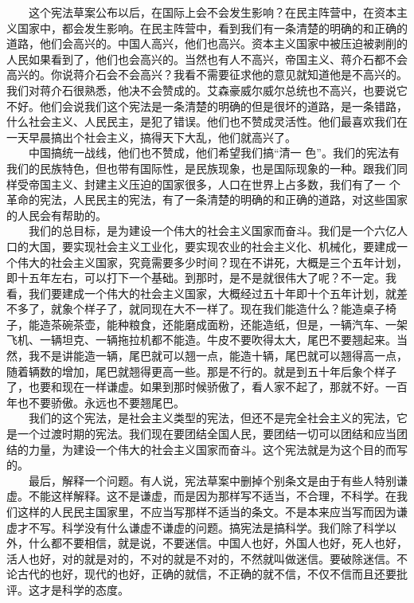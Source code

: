 \documentclass[cn,11pt,chinese]{elegantbook}
\begin{document}
　　这个宪法草案公布以后，在国际上会不会发生影响？在民主阵营中，在资本主义国家中，都会发生影响。在民主阵营中，看到我们有一条清楚的明确的和正确的道路，他们会高兴的。中国人高兴，他们也高兴。资本主义国家中被压迫被剥削的人民如果看到了，他们也会高兴的。当然也有人不高兴，帝国主义、蒋介石都不会高兴的。你说蒋介石会不会高兴？我看不需要征求他的意见就知道他是不高兴的。我们对蒋介石很熟悉，他决不会赞成的。艾森豪威尔威尔总统也不高兴，也要说它不好。他们会说我们这个宪法是一条清楚的明确的但是很坏的道路，是一条错路，什么社会主义、人民民主，是犯了错误。他们也不赞成灵活性。他们最喜欢我们在一天早晨搞出个社会主义，搞得天下大乱，他们就高兴了。\\
　　中国搞统一战线，他们也不赞成，他们希望我们搞“清一 色”。我们的宪法有我们的民族特色，但也带有国际性，是民族现象，也是国际现象的一种。跟我们同样受帝国主义、封建主义压迫的国家很多，人口在世界上占多数，我们有了一 个革命的宪法，人民民主的宪法，有了一条清楚的明确的和正确的道路，对这些国家的人民会有帮助的。\\
　　我们的总目标，是为建设一个伟大的社会主义国家而奋斗。我们是一个六亿人口的大国，要实现社会主义工业化，要实现农业的社会主义化、机械化，要建成一个伟大的社会主义国家，究竟需要多少时间？现在不讲死，大概是三个五年计划，即十五年左右，可以打下一个基础。到那时，是不是就很伟大了呢？不一定。我看，我们要建成一个伟大的社会主义国家，大概经过五十年即十个五年计划，就差不多了，就象个样子了，就同现在大不一样了。现在我们能造什么？能造桌子椅子，能造茶碗茶壶，能种粮食，还能磨成面粉，还能造纸，但是，一辆汽车、一架飞机、一辆坦克、一辆拖拉机都不能造。牛皮不要吹得太大，尾巴不要翘起来。当然，我不是讲能造一辆，尾巴就可以翘一点，能造十辆，尾巴就可以翘得高一点，随着辆数的增加，尾巴就翘得更高一些。那是不行的。就是到五十年后象个样子了，也要和现在一样谦虚。如果到那时候骄傲了，看人家不起了，那就不好。一百年也不要骄傲。永远也不要翘尾巴。\\
　　我们的这个宪法，是社会主义类型的宪法，但还不是完全社会主义的宪法，它是一个过渡时期的宪法。我们现在要团结全国人民，要团结一切可以团结和应当团结的力量，为建设一个伟大的社会主义国家而奋斗。这个宪法就是为这个目的而写的。\\
　　最后，解释一个问题。有人说，宪法草案中删掉个别条文是由于有些人特别谦虚。不能这样解释。这不是谦虚，而是因为那样写不适当，不合理，不科学。在我们这样的人民民主国家里，不应当写那样不适当的条文。不是本来应当写而因为谦虚才不写。科学没有什么谦虚不谦虚的问题。搞宪法是搞科学。我们除了科学以外，什么都不要相信，就是说，不要迷信。中国人也好，外国人也好，死人也好，活人也好，对的就是对的，不对的就是不对的，不然就叫做迷信。要破除迷信。不论古代的也好，现代的也好，正确的就信，不正确的就不信，不仅不信而且还要批评。这才是科学的态度。\\
\end{document}
